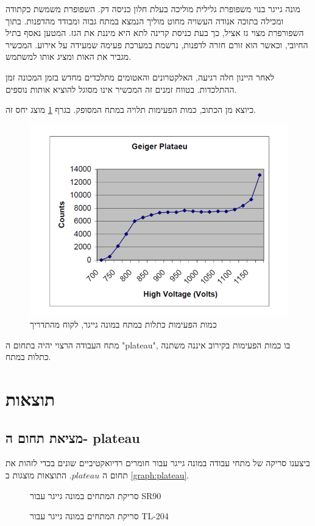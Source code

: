 \documentclass{article}
\begin{document}
מונה גייגר בנוי משפופרת גלילית מוליכה בעלת חלון כניסה דק. השפופרת משמשת כקתודה ומכילה בתוכה אנודה העשויה מחוט מוליך הנמצא במתח גבוה ומבודד מהדפנות.
בתוך השפורפרת מצוי גז אציל, כך בעת כניסת קרינה לתא היא מיננת את הגז.
המטען נאסף בתיל החיובי, וכאשר הוא זורם חזרה לדפנות, נרשמת במערכת פעימה שמעידה על אירוע. המכשיר מגביר את האות ומציג אותו למשתמש.

לאחר היינון חלה רגיעה,
האלקטרונים והאטומים מתלכדים מחדש בזמן המכונה זמן ההתלכדות. בטווח זמנים זה המכשיר אינו מסוגל להוציא אותות נוספים.

כיוצא מן הכתוב, כמות הפעימות תלויה במתח המסופק. בגרף
\ref{fig:plateau}
מוצג יחס זה.

\begin{figure}[ht!]
    \centering
    \includegraphics{plateau.png}
    \caption{כמות הפעימות כתלות במתח במונה גייגר, לקוח מהתדריך}
    \label{fig:plateau}
\end{figure}

מתח העבודה הרצוי יהיה בתחום ה
\textenglish{"plateau"},
בו כמות הפעימות בקירוב איננה משתנה כתלות במתח.

\section{
תוצאות
}
\subsection{
מציאת תחום ה-
plateau
}
ביצענו סריקה של מתחי עבודה במונה גייגר עבור חומרים רדיואקטיביים שונים בכדי לזהות את תחום ה
$plateau$.
התוצאות מוצגות ב
\ref{graph:plateau}.

\begin{graph}[H]
    \centering
    \begin{subfigure}[b]{0.49\textwidth}
    	\centering
    	\resizebox{\textwidth}{!}{}
    	\caption{ סריקת המתחים במונה גייגר עבור
    	SR90}
    
    \end{subfigure}
    \hfill
    \begin{subfigure}[b]{0.49\textwidth}
    	\centering
    	\resizebox{\textwidth}{!}{}
        \caption{סריקת המתחים במונה גייגר עבור TL-204}
    \end{subfigure}
    \label{graph:plateau}
\end{graph}
\end{document}
